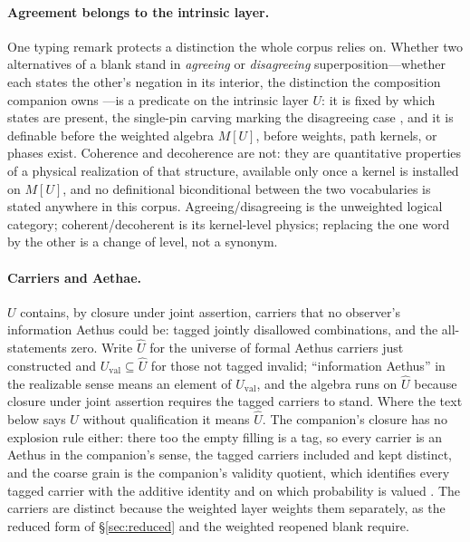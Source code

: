 \paragraph{Agreement belongs to the intrinsic layer.} One typing remark protects a distinction the whole corpus relies on. Whether two alternatives of a blank stand in \emph{agreeing} or \emph{disagreeing} superposition---whether each states the other's negation in its interior, the distinction the composition companion owns \cite{AethusUnion}---is a predicate on the intrinsic layer $U$: it is fixed by which states are present, the single-pin carving marking the disagreeing case \cite{Aethus}, and it is definable before the weighted algebra $M[U]$, before weights, path kernels, or phases exist. Coherence and decoherence are not: they are quantitative properties of a physical realization of that structure, available only once a kernel is installed on $M[U]$, and no definitional biconditional between the two vocabularies is stated anywhere in this corpus. Agreeing/disagreeing is the unweighted logical category; coherent/decoherent is its kernel-level physics; replacing the one word by the other is a change of level, not a synonym.

\paragraph{Carriers and Aethae.} $U$ contains, by closure under joint assertion, carriers that no observer's information Aethus could be: tagged jointly disallowed combinations, and the all-statements zero. Write $\widehat{U}$ for the universe of formal Aethus carriers just constructed and $U_{\mathrm{val}} \subseteq \widehat{U}$ for those not tagged invalid; ``information Aethus'' in the realizable sense means an element of $U_{\mathrm{val}}$, and the algebra runs on $\widehat{U}$ because closure under joint assertion requires the tagged carriers to stand. Where the text below says $U$ without qualification it means $\widehat{U}$. The companion's closure has no explosion rule either: there too the empty filling is a tag, so every carrier is an Aethus in the companion's sense, the tagged carriers included and kept distinct, and the coarse grain is the companion's validity quotient, which identifies every tagged carrier with the additive identity and on which probability is valued \cite{Aethus}. The carriers are distinct because the weighted layer weights them separately, as the reduced form of §\ref{sec:reduced} and the weighted reopened blank require.

